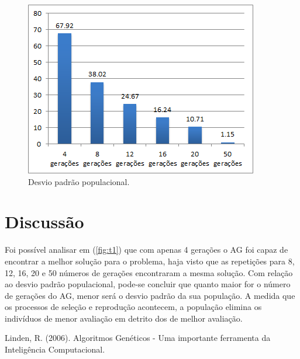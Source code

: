 \documentclass[twoside]{article}
\begin{document}
\begin{multicols}{2}
\begin{figure}[H]
\label{fig:t2}
  \caption{Desvio padrão populacional.}
  \centering
    \includegraphics[scale = 0.7]{test_aval2.png}
\end{figure}

\section{Discussão}
Foi possível analisar em (\ref{fig:t1}) que com apenas 4 gerações o AG foi capaz de encontrar a melhor solução para o problema, haja visto que as repetições para 8, 12, 16, 20 e 50 números de gerações encontraram a mesma solução. Com relação ao desvio padrão populacional, pode-se concluir que quanto maior for o número de gerações do AG, menor será o desvio padrão da sua população. A medida que os processos de seleção e reprodução acontecem, a população elimina os indivíduos de menor avaliação em detrito dos de melhor avaliação. 

\begin{thebibliography}{99} %

Linden, R. (2006).
\newblock Algoritmos Genéticos - Uma importante ferramenta da Inteligência Computacional.
 
\end{thebibliography}


\end{multicols}
\end{document}

